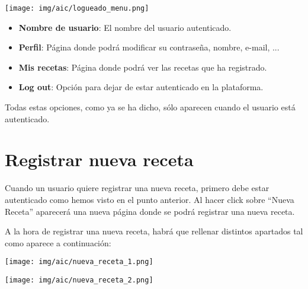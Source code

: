 \documentclass{\ClassPath/viu-tfm-template}
\begin{document}
\begin{multicols}{2}
    \begin{center}
        \vspace{-10pt}
        \texttt{[image: img/aic/logueado\_menu.png]}
        \vspace{-20pt}
    \end{center}

   \begin{itemize}
       \item \textbf{Nombre de usuario}: El nombre del usuario autenticado.
       \item \textbf{Perfil}: Página donde podrá modificar su contraseña, nombre, e-mail, ...
       \item \textbf{Mis recetas}: Página donde podrá ver las recetas que ha registrado.
       \item \textbf{Log out}: Opción para dejar de estar autenticado en la plataforma.
   \end{itemize}
\end{multicols}

Todas estas opciones, como ya se ha dicho, sólo aparecen cuando el usuario está autenticado.


\section{Registrar nueva receta}

Cuando un usuario quiere registrar una nueva receta, primero debe estar autenticado como hemos visto en el punto anterior. Al hacer click sobre “{\color{maincolor}Nueva Receta}” aparecerá una nueva página donde se podrá registrar una nueva receta.

A la hora de registrar una nueva receta, habrá que rellenar distintos apartados tal como aparece a continuación:


    \begin{center}
        \vspace{-10pt}
        \texttt{[image: img/aic/nueva\_receta\_1.png]}
        \vspace{-20pt}
    \end{center}

    \begin{center}
        \vspace{-10pt}
        \texttt{[image: img/aic/nueva\_receta\_2.png]}
        \vspace{-20pt}
    \end{center}
\end{document}
